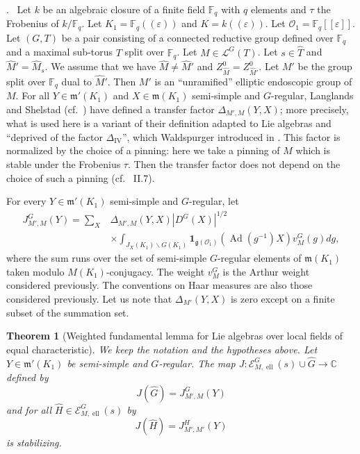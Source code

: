 \documentclass[12pt,a4paper,oneside,english,leqno]{smfart}
\makeatletter
\numberwithin{equation}{subsection}
\newcounter{theo}
\numberwithin{theo}{subsection}
\newenvironment{paragr}[1][]{\medskip\refstepcounter{subsection}%
  \par\noindent\hspace*{\parindent}\thesubsection.\ \emph{#1}%
  \@ifundefined{@empty}{}{}\ignorespaces}{\medskip}
\theoremstyle{plain}
\newtheorem{theorem}[theo]{Theorem}
\theoremstyle{definition}
\theoremstyle{remark}
\DeclareMathOperator{\Ad}{Ad}
\DeclareMathOperator{\el}{ell}
\newcommand{\CC}{\mathbb{C}}
\newcommand{\Fq}{\mathbb{F}_q}
\newcommand{\oc}{\mathcal{O}}
\newcommand{\ec}{\mathcal{E}}
\newcommand{\lc}{\mathcal{L}}
\newcommand{\Gc}{\widehat{G}}
\newcommand{\Tc}{\widehat{T}}
\newcommand{\Mc}{\widehat{M}}
\newcommand{\Hc}{\widehat{H}}
\newcommand{\ggo}{\mathfrak{g}}
\newcommand{\mgo}{\mathfrak{m}}
\newcommand{\back}{\backslash}
\newcommand{\eps}{\varepsilon}
\makeatother
\begin{document}
\begin{paragr}\label{S:19.1}
Let $k$ be an algebraic closure of a finite field $\Fq$ with $q$ elements and $\tau$ the Frobenius of $k/\Fq$. Let $K_1=\Fq((\eps))$ and $K=k((\eps))$. Let $\oc_1=\Fq[[\eps]]$. Let $(G,T)$ be a pair consisting of a connected reductive group defined over $\Fq$ and a maximal sub-torus $T$ split over $\Fq$. Let $M\in\lc^G(T)$. Let $s\in\Tc$ and $\Mc'=\Mc_s$. We assume that we have $\Mc\neq\Mc'$ and $Z^0_{\Mc}=Z^0_{\Mc'}$. Let $M'$ be the group split over $\Fq$ dual to $\Mc'$. Then $M'$ is an ``unramified'' elliptic endoscopic group of $M$. For all $Y\in\mgo'(K_1)$ and $X\in\mgo(K_1)$ semi-simple and $G$-regular, Langlands and Shelstad (cf.\ \cite{Langlands-Shelstad}) have defined a transfer factor $\Delta_{M',M}(Y,X)$; more precisely, what is used here is a variant of their definition adapted to Lie algebras and ``deprived of the factor $\Delta_{\mathrm{IV}}$'', which Waldspurger introduced in \cite{Waldspurger-transfert}. This factor is normalized by the choice of a pinning: here we take a pinning of $M$ which is stable under the Frobenius $\tau$. Then the transfer factor does not depend on the choice of such a pinning (cf.\ \cite{Hales} II.7).

For every $Y\in\mgo'(K_1)$ semi-simple and $G$-regular, let
$$
\begin{aligned}
J^G_{M',M}(Y)=\sum_X &\Delta_{M',M}(Y,X)|D^G(X)|^{1/2}\\
&\times\int_{J_X(K_1)\back G(K_1)}\mathbf{1}_{\ggo(\oc_1)}(\Ad(g^{-1})X)v^G_M(g)dg,
\end{aligned}
$$
where the sum runs over the set of semi-simple $G$-regular elements of $\mgo(K_1)$ taken modulo $M(K_1)$-conjugacy. The weight $v^G_M$ is the Arthur weight considered previously. The conventions on Haar measures are also those considered previously. Let us note that $\Delta_{M'}(Y,X)$ is zero except on a finite subset of the summation set.

\begin{theorem}[Weighted fundamental lemma for Lie algebras over local fields of equal characteristic]\label{thm:19.1.1}
We keep the notation and the hypotheses above. Let $Y\in\mgo'(K_1)$ be semi-simple and $G$-regular. The map $J:\ec^G_{M,\el}(s)\cup\Gc\to\CC$ defined by
$$
J(\Gc)=J^G_{M',M}(Y)
$$
and for all $\Hc\in\ec^G_{M,\el}(s)$ by
$$
J(\Hc)=J^H_{M',M'}(Y)
$$
is stabilizing.
\end{theorem}


\end{paragr}
\end{document}
